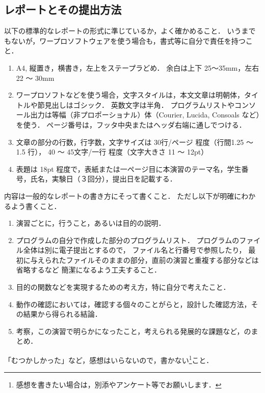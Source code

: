 \documentclass[11pt,a4,epsf]{jarticle}
\begin{document}
\begin{appendices}

\section{レポートとその提出方法}

以下の標準的なレポートの形式に準じているか，よく確かめること．
いうまでもないが，ワープロソフトウェアを使う場合も，書式等に自分で責任を持つこと．
\begin{enumerate}
 \item A4, 縦置き，横書き，左上をステープラどめ．
余白は上下 25〜35mm，左右 22 〜 30mm
\item ワープロソフトなどを使う場合，文字スタイルは，本文文章は明朝体，タイトルや節見出しはゴシック．
英数文字は半角．
プログラムリストやコンソール出力は等幅（非プロポーショナル）体（Courier, Lucida, Consoals など）を使う．
ページ番号は，フッタ中央またはヘッダ右端に通しでつける．
 \item 文章の部分の行数，行字数，文字サイズは 30行/ページ 程度（行間1.25 〜 1.5 行），
40 〜 45文字/一行 程度（文字大きさ 11 〜 12pt）
\item 表題は 18pt 程度で，表紙または一ページ目に本演習のテーマ名，学生番号，氏名，実験日（３回分），提出日を記載する．
\end{enumerate}

内容は一般的なレポートの書き方にそって書くこと．
ただし以下が明確にわかるよう書くこと．
\begin{enumerate}
  \item 演習ごとに，行うこと，あるいは目的の説明．
  \item プログラムの自分で作成した部分のプログラムリスト．
プログラムのファイル全体は別に電子提出とするので，
ファイル名と行番号で参照したり，
最初に与えられたファイルそのままの部分，直前の演習と重複する部分などは省略するなど
簡潔になるよう工夫すること．
   \item 目的の関数などを実現するための考え方，特に自分で考えたこと．
   \item 動作の確認においては，確認する個々のことがらと，設計した確認方法，その結果から得られる結論．
   \item 考察，この演習で明らかになったこと，考えられる発展的な課題など，のまとめ．
\end{enumerate}
「むつかしかった」など，感想はいらないので，書かない\footnote{感想を書きたい場合は，別添やアンケート等でお願いします．}こと．



\end{appendices}
\end{document}
